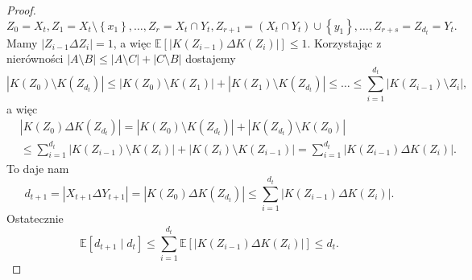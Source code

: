 \begin{proof}
    \[Z_0 = X_t, Z_1 = X_t \setminus \left\{ x_1 \right\} ,\ldots, Z_r = X_t \cap Y_t, Z_{r+1} = \left( X_t \cap Y_t \right) \cup \left\{ y_1 \right\} ,\ldots, Z_{r+s} = Z_{d_t} = Y_t .\]
    Mamy \(\left|Z_{i-1}\Delta Z_i\right|=1\), a więc \(\mathbb{E}\left[ \left|K\left( Z_{i-1} \right) \Delta K\left( Z_i \right) \right| \right] \le 1\). Korzystając z nierówności \(\left|A\setminus B \right|\le \left|A\setminus C \right|+\left|C\setminus B\right|\) dostajemy
    \[ \left|K\left( Z_0 \right) \setminus K\left( Z_{d_t} \right) \right|\le \left|K\left( Z_0 \right) \setminus K\left( Z_1 \right) \right|+ \left|K\left( Z_1 \right) \setminus K\left( Z_{d_t} \right) \right|\le \ldots\le \sum_{i=1}^{d_t} \left|K\left( Z_{i-1} \right) \setminus Z_i\right|, \] 
    a więc
    \begin{align*}
        &\left|K\left( Z_0 \right) \Delta K\left( Z_{d_t} \right) \right| = \left|K\left( Z_0 \right) \setminus  K\left( Z_{d_t} \right) \right|+ \left|K\left( Z_{d_t} \right) \setminus K\left( Z_0 \right) \right| \\ 
        &\le \sum_{i=1}^{d_t} \left|K\left( Z_{i-1} \right) \setminus K\left( Z_i \right) \right|+ \left|K\left( Z_i \right) \setminus K\left( Z_{i-1} \right) \right| = \sum_{i=1}^{d_t} \left|K\left( Z_{i-1}\right) \Delta K\left( Z_i \right)  \right| .
    \end{align*}
    To daje nam
    \[ d_{t+1} = \left|X_{t+1}\Delta Y_{t+1}\right| = \left|K\left( Z_0 \right) \Delta K\left( Z_{d_t} \right) \right|\le \sum_{i=1}^{d_t} \left|K\left( Z_{i-1} \right) \Delta K\left( Z_i \right) \right|. \] 
    Ostatecznie
    \[ \mathbb{E}\left[ d_{t+1} \mid d_t \right] \le \sum_{i=1}^{d_t} \mathbb{E}\left[ \left|K\left( Z_{i-1} \right) \Delta K\left( Z_i \right) \right| \right] \le d_t. \] 
\end{proof}

